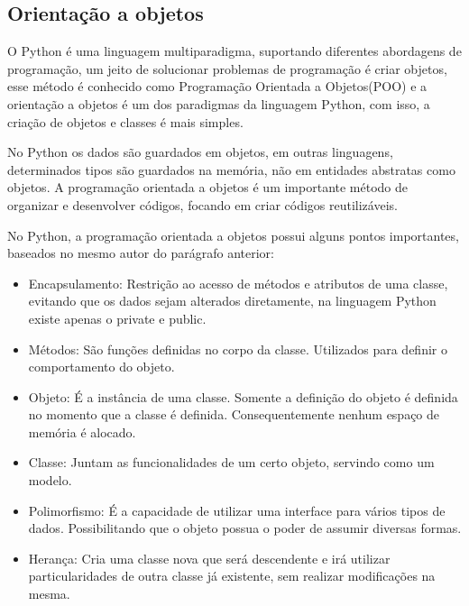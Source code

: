         \subsection{Orientação a objetos}  
        O Python é uma linguagem multiparadigma, suportando diferentes abordagens de programação, um jeito de solucionar problemas de programação é criar objetos, esse método é conhecido como Programação Orientada a Objetos(POO) e a orientação a objetos é um dos paradigmas da linguagem Python, com isso, a criação de objetos e classes é mais simples. 
        
        No Python os dados são guardados em objetos, em outras linguagens, determinados tipos são guardados na memória, não em entidades abstratas como objetos. A programação orientada a objetos é um importante método de organizar e desenvolver códigos, focando em criar códigos reutilizáveis. \cite{Lutz2007}
        
        No Python, a programação orientada a objetos possui alguns pontos importantes, baseados no mesmo autor do parágrafo anterior: 
        \begin{itemize}
        	\item Encapsulamento: Restrição ao acesso de métodos e atributos de uma classe, evitando que os dados sejam alterados diretamente, na linguagem Python existe apenas o private e public.
        	
        	\item Métodos: São funções definidas no corpo da classe. Utilizados para definir o comportamento do objeto. 
        	
        	\item Objeto: É a instância de uma classe. Somente a definição do objeto é definida no momento que a classe é definida.  Consequentemente nenhum espaço de memória é alocado.
        	
        	\item Classe: Juntam as funcionalidades de um certo objeto, servindo como um modelo.
        	
        	\item Polimorfismo: É a capacidade de utilizar uma interface para vários tipos de dados. Possibilitando que o objeto possua o poder de assumir diversas formas. 
        	
        	\item Herança: Cria uma classe nova que será descendente e irá utilizar particularidades de outra classe já existente, sem realizar modificações na mesma.
        	 
        	
        \end{itemize}


